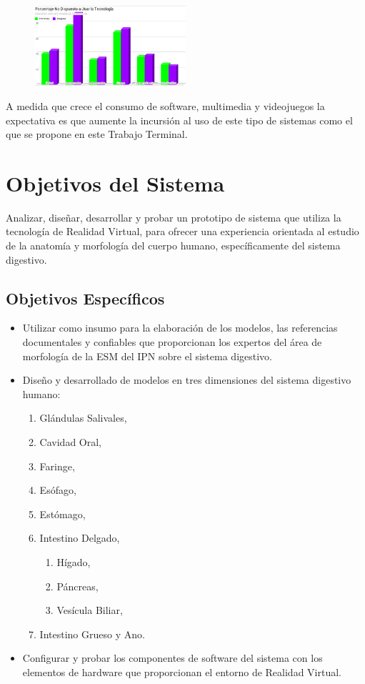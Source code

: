 \begin{figure}[H]
	\begin{center}
 		\includegraphics[width = 0.5\textwidth]{v3/images/chart1.png}
	\end{center} 
\end{figure}
A medida que crece el consumo de software, multimedia y videojuegos la expectativa es que aumente la incursión al uso de este tipo  de sistemas como el que se propone en este Trabajo Terminal.



\section{Objetivos del Sistema}
Analizar, diseñar, desarrollar y probar un prototipo de sistema que utiliza la tecnología de Realidad Virtual, para ofrecer una experiencia orientada al estudio 
de la anatomía y morfología del cuerpo humano, específicamente del sistema digestivo.\\
\subsection{Objetivos Específicos}
\begin{itemize}
	\item Utilizar como insumo para la elaboración de los modelos, las referencias documentales y confiables que proporcionan los expertos del área de morfología de la ESM del IPN sobre el sistema digestivo.
	\item Diseño y desarrollado de modelos en tres dimensiones del sistema digestivo humano:
	\begin{enumerate}
		\item Glándulas Salivales,
		\item Cavidad Oral,
		\item Faringe,
		\item Esófago,
		\item Estómago,
		\item Intestino Delgado,
		\begin{enumerate}
		  \item Hígado,
		  \item Páncreas,
		  \item Vesícula Biliar,
		\end{enumerate}
		\item Intestino Grueso y Ano.
	\end{enumerate}
		\item Configurar y probar los componentes de software del sistema con los elementos de hardware que proporcionan el entorno de  Realidad Virtual.	
\end{itemize}

